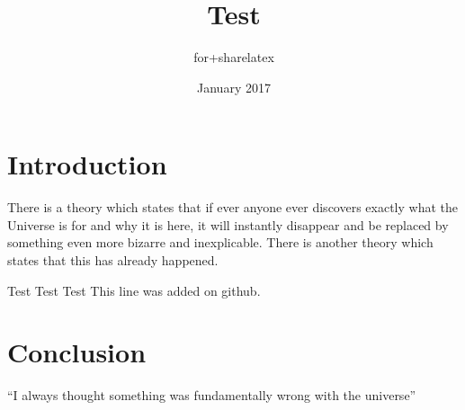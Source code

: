\documentclass{article}
\title{Test}
\author{for+sharelatex }
\date{January 2017}
\begin{document}
\maketitle

\section{Introduction}
There is a theory which states that if ever anyone ever discovers exactly what the Universe is for and why it is here, it will instantly disappear and be replaced by something even more bizarre and inexplicable.
There is another theory which states that this has already happened.

Test Test Test
This line was added on github.

\section{Conclusion}
``I always thought something was fundamentally wrong with the universe'' 



\end{document}
